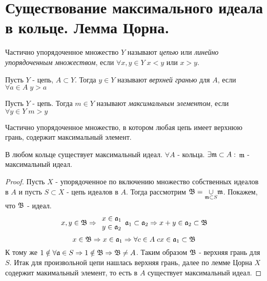 \section{Существование максимального идеала в кольце. Лемма Цорна.}

\begin{defn}
  Частично упорядоченное множество $ Y $ называют \emph{цепью} или \emph{линейно упорядоченным множеством}, если
  $ \forall x, y \in Y \; x < y $ или $ x > y $.
\end{defn}

\begin{defn}
  Пусть $ Y $ - цепь, $ A \subset Y $. 
  Тогда $ y \in Y $ называют \emph{верхней гранью} для $ A $, если $ \forall a \in A \; y > a $
\end{defn}

\begin{defn}
  Пусть $ Y $ - цепь. Тогда $ m \in Y $ называют \emph{максимальным элементом}, если $ \forall y \in Y \; m > y $
\end{defn}

\begin{lem}[Цорна]
  Частично упорядоченное множество, в котором любая цепь имеет верхнюю грань, содержит максимальный элемент.
\end{lem}

\begin{thm}
  В любом кольце существует максимальный идеал. \newline
  $ \forall A $ - кольца. $ \exists \mathfrak{m} \subset A :$ $ \mathfrak{m} $ - максимальный идеал.
\end{thm}
\begin{proof}
  Пусть $ X $ - упорядоченное по включению множество собственных идеалов в $ A $ и 
  пусть $ S \subset X $ - цепь идеалов в $ A $. Тогда рассмотрим 
  $ \mathfrak{B} = \underset{\mathfrak{m} \subset S}{\cup} \mathfrak{m} $. Покажем, что $ \mathfrak{B} $ - идеал.
  \[ x, y \in \mathfrak{B} \Rightarrow \begin{array}{l l}
                       x \in \mathfrak{a}_{1} \\
		       y \in \mathfrak{a}_{2}
		     \end{array}  
		     \mathfrak{a}_{1} \subset \mathfrak{a}_{2} \Rightarrow x + y \in \mathfrak{a}_{2} \subset \mathfrak{B} \]
		     \[ x \in \mathfrak{B} \Rightarrow x \in \mathfrak{a}_{1} \Rightarrow \forall c \in A \; cx \in \mathfrak{a}_{1} \subset \mathfrak{B} \]
  К тому же $ 1 \notin \forall \mathfrak{a} \in S \Rightarrow 1 \notin \mathfrak{B} \Rightarrow \mathfrak{B} \ne A $. Таким образом
  $ \mathfrak{B} $ - верхняя грань для $ S $. Итак для произвольной цепи нашлась верхняя грань, далее по лемме Цорна $ X $ содержит 
  макимальный элемент, то есть в $ A $ существует максимальный идеал.
\end{proof}

